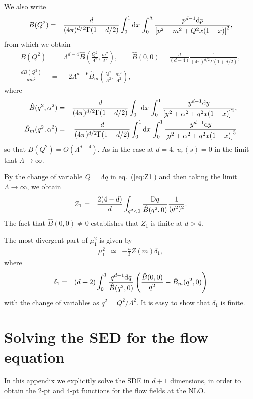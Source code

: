 \documentclass[preprint]{ptephy_v1}%
\newcommand{\rmd}{{\rm d}}
\newcommand{\rmD}{{\rm D}}
\begin{document}
We also write
\begin{eqnarray}
B(Q^2) &=& \frac{d}{(4\pi)^{d/2}\Gamma(1+d/2)}\int_0^1  \rmd x\,\int_0^\Lambda \frac{ p^{d-1} \rmd p}{\left[p^2+m^2 + Q^2 x(1-x)\right]^2} ,
\end{eqnarray}
from which we obtain
\begin{eqnarray}
B(Q^2)&=&  \Lambda^{d-4} \hat B\left(\frac{Q^2}{\Lambda^2}, \frac{m^2}{\Lambda^2}\right), \qquad
\hat B(0,0) =\frac{d}{(d-4)} \frac{1}{(4\pi)^{d/2}\Gamma(1+d/2)},\\
\label{eq:BQ_d5}
\frac{d B(Q^2)}{d m^2} &=& -2 \Lambda^{d-6} \hat B_m\left(\frac{Q^2}{\Lambda^2}, \frac{m^2}{\Lambda^2}\right),
\end{eqnarray}
where
\begin{eqnarray}
\hat B(q^2,\alpha^2) &=& \frac{d}{(4\pi)^{d/2}\Gamma(1+d/2)}\int_0^1  \rmd x\,\int_0^1 \frac{ y^{d-1}  \rmd y}{\left[y^2+\alpha^2 + q^2 x(1-x)\right]^2} , \\
\hat B_m(q^2,\alpha^2) &=& \frac{d}{(4\pi)^{d/2}\Gamma(1+d/2)}\int_0^1  \rmd x\,\int_0^1 \frac{ y^{d-1}  \rmd y}{\left[y^2+\alpha^2 + q^2 x(1-x)\right]^3} 
\end{eqnarray}
so that $B(Q^2) =O(\Lambda^{d-4})$.
As in the case at $d=4$, $u_r(s)=0$ in the limit that $\Lambda\rightarrow\infty$.

By the change of variable  $Q=\Lambda q$ in eq.~(\ref{eq:Z1}) and then taking the limit $\Lambda\rightarrow \infty$, we obtain
\begin{eqnarray}
Z_1 &= & \frac{2(4-d)}{d} \int_{q^2<1} \frac{\rmD q}{\hat B(q^2,0)}\frac{1}{(q^2)^2}.
\end{eqnarray} 
The fact that $\hat B(0,0)\not=0$ establishes that  $Z_1$ is finite at $d > 4$.

The most divergent part of $\mu_1^2$ is given by
\begin{eqnarray}
\mu_1^2 &\simeq& -\frac{u}{3} Z(m) \delta_1,
\end{eqnarray}
where
\begin{eqnarray}
\delta_1 &=& (d-2) \int_0^1 \frac{q^{d-1} \rmd q}{\hat B(q^2,0)} \left( \frac{\hat B(0,0)}{q^2} -\hat B_m(q^2,0)   \right)
\end{eqnarray}
with the change of variables as $q^2 = Q^2/\Lambda^2$. It is easy to show that $\delta_1$ is finite.


\section{Solving the SED for the flow equation}  
\label{app:SDE_flow}
In this appendix we explicitly solve the SDE in $d+1$ dimensions, in order to  obtain the 2-pt and 4-pt functions for the flow fields at the NLO.
\end{document}
